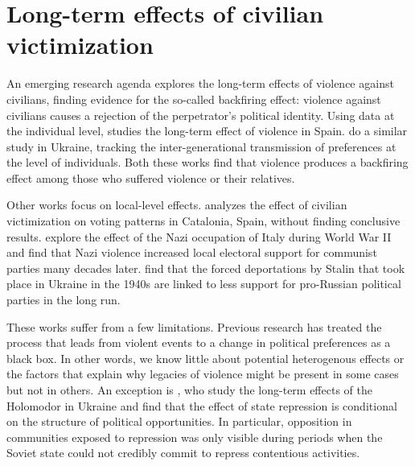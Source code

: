 \documentclass[12pt, notitlepage]{article}
\begin{document}
\section*{Long-term effects of civilian victimization}

An emerging research agenda explores the long-term effects of violence against civilians, finding evidence for the so-called backfiring effect: violence against civilians causes a rejection of the perpetrator's political identity.
Using data at the individual level, \citet{Balcells:2012aa} studies the long-term effect of violence in Spain.
\citet{Lupu:2017aa} do a similar study in Ukraine, tracking the inter-generational transmission of preferences at the level of individuals.
Both these works find that violence produces a backfiring effect among those who suffered violence or their relatives.

Other works focus on local-level effects.
\citet{Balcells:2010ab} analyzes the effect of civilian victimization on voting patterns in Catalonia, Spain, without finding conclusive results.
\citet{Fontana:2017aa} explore the effect of the Nazi occupation of Italy during World War II and find that Nazi violence increased local electoral support for communist parties many decades later.
\citet{Rozenas:2017aa} find that the forced deportations by Stalin that took place in Ukraine in the 1940s are linked to less support for pro-Russian political parties in the long run.

These works suffer from a few limitations.
Previous research has treated the process that leads from violent events to a change in political preferences as a black box.
In other words, we know little about potential heterogenous effects or the factors that explain why legacies of violence might be present in some cases but not in others.
An exception is \citet{Rozenas:2019aa}, who study the long-term effects of the Holomodor in Ukraine and find that the effect of state repression is conditional on the structure of political opportunities.
In particular, opposition in communities exposed to repression was only visible during periods when the Soviet state could not credibly commit to repress contentious activities.
\end{document}
